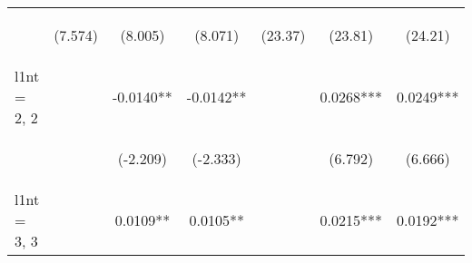 \documentclass[]{article}
\begin{document}
\begin{center}
\begin{tabular}{lcccccc}
        \vspace{4pt}     & \begin{footnotesize}(7.574)\end{footnotesize}  & \begin{footnotesize}(8.005)\end{footnotesize}  & \begin{footnotesize}(8.071)\end{footnotesize}  & \begin{footnotesize}(23.37)\end{footnotesize}   & \begin{footnotesize}(23.81)\end{footnotesize}  & \begin{footnotesize}(24.21)\end{footnotesize}  \\
        l1nt = 2, 2      &                                                & -0.0140**                                      & -0.0142**                                      &                                                 & 0.0268***                                      & 0.0249***                                      \\
        \vspace{4pt}     & \begin{footnotesize}\end{footnotesize}         & \begin{footnotesize}(-2.209)\end{footnotesize} & \begin{footnotesize}(-2.333)\end{footnotesize} & \begin{footnotesize}\end{footnotesize}          & \begin{footnotesize}(6.792)\end{footnotesize}  & \begin{footnotesize}(6.666)\end{footnotesize}  \\
        l1nt = 3, 3      &                                                & 0.0109**                                       & 0.0105**                                       &                                                 & 0.0215***                                      & 0.0192***                                      \\

\end{tabular}
\end{center}
\end{document}
